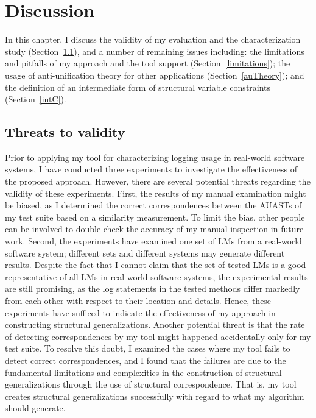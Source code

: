 \chapter{Discussion}  \label{diss}

In this chapter, I discuss the validity of my evaluation and the characterization study (Section~\ref{threads}), and a number of remaining issues including: the limitations and pitfalls of my approach and the tool support (Section~\ref{limitations}); the usage of anti-unification theory for other applications (Section~\ref{auTheory}); and the definition of an intermediate form of structural variable constraints (Section~\ref{intC}).

\section{Threats to validity}  \label{threads}
Prior to applying my tool for characterizing logging usage in real-world software systems, I have conducted three experiments to investigate the effectiveness of the proposed approach. However, there are several potential threats regarding the validity of these experiments. First, the results of my manual examination might be biased, as I determined the correct correspondences between the AUASTs of my test suite based on a similarity measurement. To limit the bias, other people can be involved to double check the accuracy of my manual inspection in future work. Second, the experiments have examined one set of LMs from a real-world software system; different sets and different systems may generate different results. Despite the fact that I cannot claim that the set of tested LMs is a good representative of all LMs in real-world software systems, the experimental results are still promising, as the log statements in the tested methods differ markedly from each other with respect to their location and details. Hence, these experiments have sufficed to indicate the effectiveness of my approach in constructing structural generalizations. Another potential threat is that the rate of detecting correspondences by my tool might happened accidentally only for my test suite. To resolve this doubt, I examined the cases where my tool fails to detect correct correspondences, and I found that the failures are due to the fundamental limitations and complexities in the construction of structural generalizations through the use of structural correspondence. That is, my tool creates structural generalizations successfully with regard to what my algorithm should generate.

